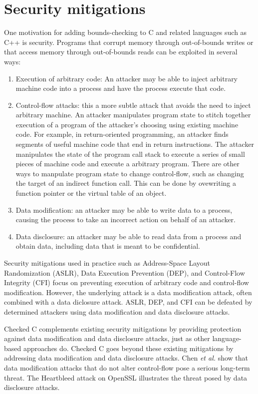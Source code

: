 \section{Security mitigations}
One motivation for adding bounds-checking to C and related languages
such as C++ is security.  Programs that
corrupt memory through out-of-bounds writes or that access memory through
out-of-bounds reads can be exploited in several ways:
\begin{enumerate}
\item  Execution of arbitrary code: An attacker may be able to inject arbitrary machine code into a process and have the process  execute that code.
\item Control-flow attacks: this a more subtle attack that avoids the need to inject arbitrary machine.  An attacker manipulates program state to
stitch together execution of a program of the attacker's choosing
using existing machine code.
For example, in return-oriented programming, an attacker finds segments of useful
machine code that end in return instructions. The attacker manipulates the state of 
the program call  stack to execute a series of small pieces of machine code and execute
a arbitrary program.  There are other ways to manpulate program state to
change control-flow, such as changing the target of an indirect function call.  
This can be done by 
ovewriting a function pointer or the virtual table of an object.
\item Data modification: an attacker may be able to write data to a process, causing the process to take an incorrect action on behalf of an attacker.
\item  Data disclosure: an attacker may be able to read data from a process 
and obtain data, including data that is meant to be confidential.  
\end{enumerate}

Security mitigations used in practice such as Address-Space Layout Randomization
(ASLR), Data Execution Prevention (DEP), and Control-Flow Integrity (CFI)
focus on preventing execution of arbitrary code and control-flow modification.  
However, the underlying attack is a data modification attack, often
combined with a data diclosure attack.  ASLR, DEP, and CFI
can be defeated by determined attackers using data modification and data disclosure
attacks.

Checked C complements existing security mitigations by providing
protection against data modification and data disclosure attacks,
just as other language-based approaches do.  Checked C goes beyond
these existing mitigations by addressing data modification and data
disclosure attacks.  Chen {\it et al.} \cite{Chen2005} show that data modification
attacks that do not alter control-flow pose a serious long-term threat.
The Heartbleed attack on OpenSSL illustrates the threat posed by
data disclosure attacks.

